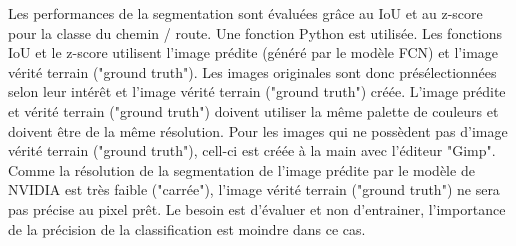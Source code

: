 \par Les performances de la segmentation sont évaluées grâce au IoU et au z-score pour la classe du chemin / route. Une fonction Python est utilisée. Les fonctions IoU et le z-score utilisent l'image prédite (généré par le modèle FCN) et l'image vérité terrain ("ground truth"). Les images originales sont donc présélectionnées selon leur intérêt et l'image vérité terrain ("ground truth") créée. L'image prédite et vérité terrain ("ground truth") doivent utiliser la même palette de couleurs et doivent être de la même résolution. Pour les images qui ne possèdent pas d'image vérité terrain ("ground truth"), cell-ci est créée à la main avec l'éditeur "Gimp". Comme la résolution de la segmentation de l'image prédite par le modèle de NVIDIA est très faible ("carrée"), l'image vérité terrain ("ground truth") ne sera pas précise au pixel prêt. Le besoin est d'évaluer et non d'entrainer, l'importance de la précision de la classification est moindre dans ce cas. 